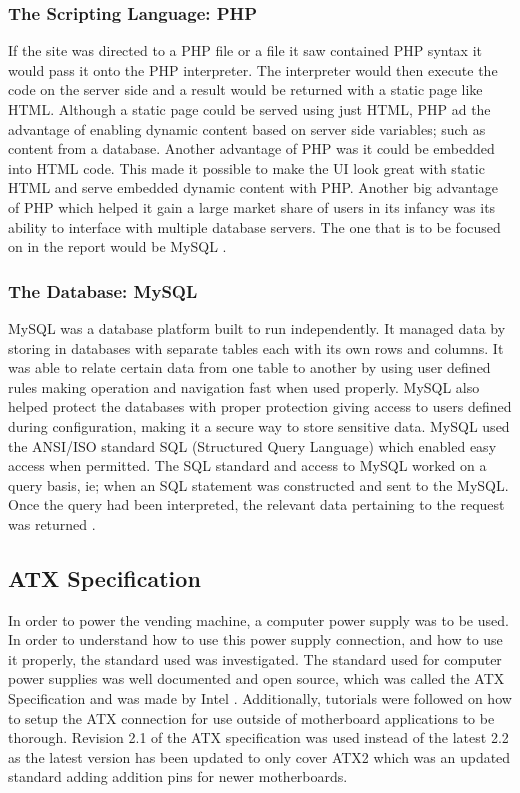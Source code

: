 \documentclass[a4paper,11pt]{article}
\numberwithin{figure}{section}
\numberwithin{table}{section}
\begin{document}
\subsubsection{The Scripting Language: PHP}
If the site was directed to a PHP file or a file it saw contained PHP syntax it would pass it onto the PHP interpreter. The interpreter would then execute the code on the server side and a result would be returned with a static page like HTML. Although a static page could be served using just HTML, PHP ad the advantage of enabling dynamic content based on server side variables; such as content from a database. Another advantage of PHP was it could be embedded into HTML code. This made it possible to make the UI look great with static HTML and serve embedded dynamic content with PHP. Another big advantage of PHP which helped it gain a large market share of users in its infancy was its ability to interface with multiple database servers. The one that is to be focused on in the report would be MySQL \cite{PHP}.


\subsubsection{The Database: MySQL}
MySQL was a database platform built to run independently. It managed data by storing in databases with separate tables each with its own rows and columns. It was able to relate certain data from one table to another by using user defined rules making operation and navigation fast when used properly. MySQL also helped protect the databases with proper protection giving access to users defined during configuration, making it a secure way to store sensitive data. MySQL used the ANSI/ISO standard SQL (Structured Query Language) which enabled easy access when permitted. The SQL standard and access to MySQL worked on a query basis, ie; when an SQL statement was constructed and sent to the MySQL. Once the query had been interpreted, the relevant data pertaining to the request was returned \cite{mysql}.  

\subsection{ATX Specification}
In order to power the vending machine, a computer power supply was to be used. In order to understand how to use this power supply connection, and how to use it properly, the standard used was investigated. The standard used for computer power supplies was well documented and open source, which was called the ATX Specification and was made by Intel \cite{ATX}. Additionally, tutorials were followed on how to setup the ATX connection for use outside of motherboard applications to be thorough. Revision 2.1 of the ATX specification was used instead of the latest 2.2 as the latest version has been updated to only cover ATX2 which was an updated standard adding addition pins for newer motherboards.
\end{document}
